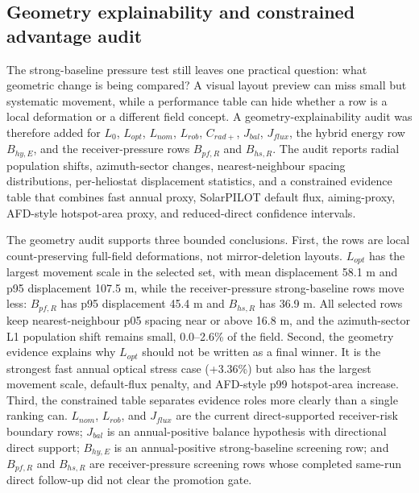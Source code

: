 \documentclass[final,3p,times]{elsarticle}
\begin{document}
\subsection{Geometry explainability and constrained advantage audit}
The strong-baseline pressure test still leaves one practical question: what geometric change is being compared? A visual layout preview can miss small but systematic movement, while a performance table can hide whether a row is a local deformation or a different field concept. A geometry-explainability audit was therefore added for $L_0$, $L_{opt}$, $L_{nom}$, $L_{rob}$, $C_{rad+}$, $J_{bal}$, $J_{flux}$, the hybrid energy row $B_{hy,E}$, and the receiver-pressure rows $B_{pf,R}$ and $B_{hs,R}$. The audit reports radial population shifts, azimuth-sector changes, nearest-neighbour spacing distributions, per-heliostat displacement statistics, and a constrained evidence table that combines fast annual proxy, SolarPILOT default flux, aiming-proxy, AFD-style hotspot-area proxy, and reduced-direct confidence intervals.

The geometry audit supports three bounded conclusions. First, the rows are local count-preserving full-field deformations, not mirror-deletion layouts. $L_{opt}$ has the largest movement scale in the selected set, with mean displacement 58.1 m and p95 displacement 107.5 m, while the receiver-pressure strong-baseline rows move less: $B_{pf,R}$ has p95 displacement 45.4 m and $B_{hs,R}$ has 36.9 m. All selected rows keep nearest-neighbour p05 spacing near or above 16.8 m, and the azimuth-sector L1 population shift remains small, 0.0--2.6\% of the field. Second, the geometry evidence explains why $L_{opt}$ should not be written as a final winner. It is the strongest fast annual optical stress case (+3.36\%) but also has the largest movement scale, default-flux penalty, and AFD-style p99 hotspot-area increase. Third, the constrained table separates evidence roles more clearly than a single ranking can. $L_{nom}$, $L_{rob}$, and $J_{flux}$ are the current direct-supported receiver-risk boundary rows; $J_{bal}$ is an annual-positive balance hypothesis with directional direct support; $B_{hy,E}$ is an annual-positive strong-baseline screening row; and $B_{pf,R}$ and $B_{hs,R}$ are receiver-pressure screening rows whose completed same-run direct follow-up did not clear the promotion gate.
\end{document}
